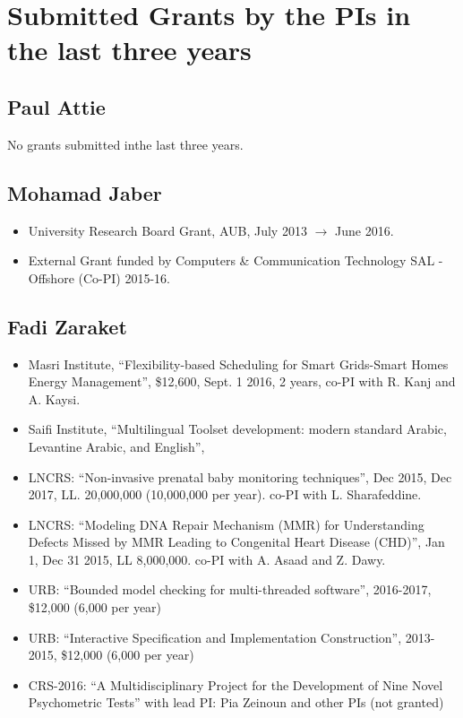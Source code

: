 \section{Submitted Grants by the PIs in the last three years}

\subsection{Paul Attie}

No grants submitted inthe last three years.



\subsection{Mohamad Jaber}
\begin{itemize}
\item{University Research Board Grant, AUB, July 2013 $\rightarrow$ June 2016.}
\item{External Grant funded by Computers \& Communication Technology SAL - Offshore (Co-PI) 2015-16.}
\end{itemize}


\subsection{Fadi Zaraket}

\begin{itemize}
\item Masri Institute, ``Flexibility-based Scheduling for Smart Grids-Smart Homes Energy Management'', 
  \$12,600, Sept. 1 2016, 2 years, co-PI with R. Kanj and A. Kaysi. 

\item Saifi Institute, ``Multilingual Toolset development: modern standard Arabic, Levantine Arabic, and English'', 

\item LNCRS: ``Non-invasive prenatal baby monitoring techniques'', 
  Dec 2015, Dec 2017, LL. 20,000,000 (10,000,000 per year). co-PI with L. Sharafeddine. 

\item LNCRS: ``Modeling DNA Repair Mechanism (MMR) for Understanding Defects Missed by MMR Leading to  Congenital Heart Disease (CHD)'',
    Jan 1, Dec 31 2015, LL 8,000,000.  co-PI with A. Asaad and Z. Dawy. 

\item URB: ``Bounded model checking for multi-threaded software'', 2016-2017, \$12,000 (6,000 per year) 

\item URB: ``Interactive Specification and Implementation Construction'', 2013-2015, \$12,000 (6,000 per year) 

\item CRS-2016: ``A Multidisciplinary Project for the Development of Nine Novel Psychometric Tests'' with lead PI: Pia Zeinoun and other PIs (not granted) 
\end{itemize}

